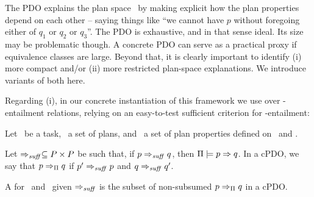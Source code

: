 The PDO explains the plan space \plans\ by making explicit how the
plan properties depend on each other -- saying things like ``we cannot
have $p$ without foregoing either of $q_1$ or $q_2$ or $q_3$''. The
PDO is exhaustive, and in that sense ideal. Its size may be
problematic though. A concrete PDO can serve as a practical proxy if
equivalence classes are large. Beyond that, it is clearly important to
identify (i) more compact and/or (ii) more restricted plan-space
explanations. We introduce variants of both here.

Regarding (i), in our concrete instantiation of this framework we use
 over \plans-entailment relations, relying on an
easy-to-test sufficient criterion for \plans-entailment:
%
%
%

\begin{definition}\label{def:dcpdo}
Let \task\ be a task, \plans\ a set of plans, and \props\ a set of
plan properties defined on \task\ and \plans.

Let $\Rightarrow_{\mathit{suff}} \subseteq P \times P$ be such that, if $p
\Rightarrow_{\mathit{suff}} q$, then $\Pi \models p \Rightarrow q$.
%
In a cPDO, we say that $p \Rightarrow_{\Pi} q$  if $p'
\Rightarrow_{\mathit{suff}} p$ and $q \Rightarrow_{\mathit{suff}} q'$.

A  for \plans\ and \props\ given
$\Rightarrow_{\mathit{suff}}$ is the subset of non-subsumed $p \Rightarrow_{\Pi} q$
in a cPDO.
%
\end{definition}

